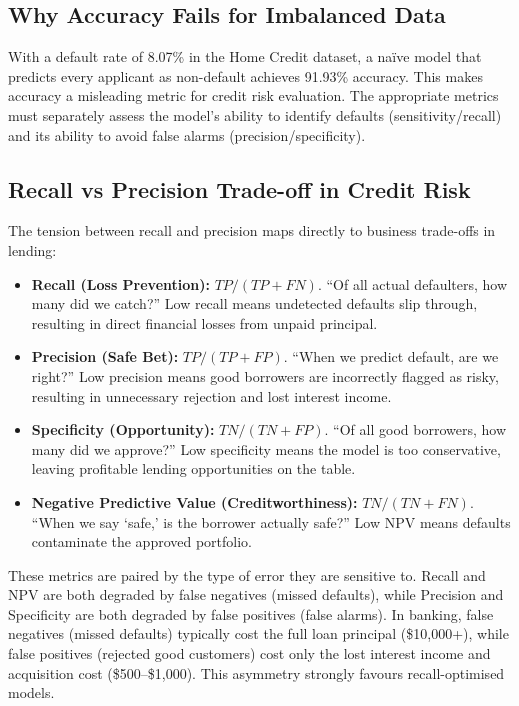 \subsection{Why Accuracy Fails for Imbalanced Data}

With a default rate of 8.07\% in the Home Credit dataset, a na\"ive model that predicts every applicant as non-default achieves 91.93\% accuracy. This makes accuracy a misleading metric for credit risk evaluation. The appropriate metrics must separately assess the model's ability to identify defaults (sensitivity/recall) and its ability to avoid false alarms (precision/specificity).

\subsection{Recall vs Precision Trade-off in Credit Risk}

The tension between recall and precision maps directly to business trade-offs in lending:

\begin{itemize}
    \item \textbf{Recall (Loss Prevention):} $TP / (TP + FN)$. ``Of all actual defaulters, how many did we catch?'' Low recall means undetected defaults slip through, resulting in direct financial losses from unpaid principal.

    \item \textbf{Precision (Safe Bet):} $TP / (TP + FP)$. ``When we predict default, are we right?'' Low precision means good borrowers are incorrectly flagged as risky, resulting in unnecessary rejection and lost interest income.

    \item \textbf{Specificity (Opportunity):} $TN / (TN + FP)$. ``Of all good borrowers, how many did we approve?'' Low specificity means the model is too conservative, leaving profitable lending opportunities on the table.

    \item \textbf{Negative Predictive Value (Creditworthiness):} $TN / (TN + FN)$. ``When we say `safe,' is the borrower actually safe?'' Low NPV means defaults contaminate the approved portfolio.
\end{itemize}

These metrics are paired by the type of error they are sensitive to. Recall and NPV are both degraded by false negatives (missed defaults), while Precision and Specificity are both degraded by false positives (false alarms). In banking, false negatives (missed defaults) typically cost the full loan principal (\$10,000+), while false positives (rejected good customers) cost only the lost interest income and acquisition cost (\$500--\$1,000). This asymmetry strongly favours recall-optimised models.

